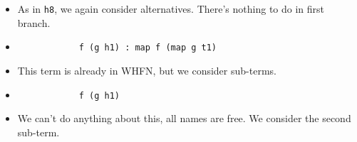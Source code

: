 \documentclass{beamer}
\begin{document}
\begin{frame}[fragile]

    \begin{itemize}[<+->]
        \item[]
            As in \texttt{h8}, we again consider alternatives. There's nothing
            to do in first branch.

        \item[]
            \begin{verbatim}
            f (g h1) : map f (map g t1)
            \end{verbatim}

        \item[]
            This term is already in WHFN, but we consider sub-terms.

        \item[]
            \begin{verbatim}
            f (g h1)
            \end{verbatim}

        \item[]
            We can't do anything about this, all names are free. We consider the
            second sub-term.

    \end{itemize}

\end{frame}
\end{document}

